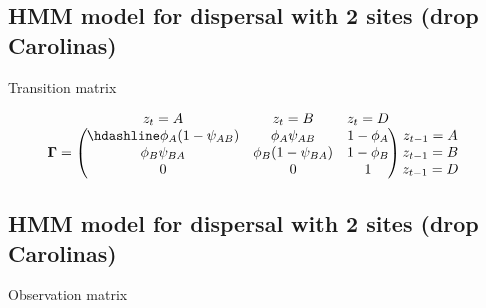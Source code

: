 \documentclass[
  12pt,
]{krantz}
\begin{document}
\hypertarget{hmm-model-for-dispersal-with-2-sites-drop-carolinas}{%
\subsection{HMM model for dispersal with 2 sites (drop Carolinas)}\label{hmm-model-for-dispersal-with-2-sites-drop-carolinas}}

Transition matrix

\[
\begin{matrix}
& \\
\mathbf{\Gamma} =
    \left ( \vphantom{ \begin{matrix} 12 \\ 12 \\ 12 \end{matrix} } \right .
\end{matrix}
\hspace{-1.2em}
\begin{matrix}
    z_{t}=A & z_{t}=B & z_{t}=D \\ \hdashline
\phi_A (1-\psi_{AB}) & \phi_A \psi_{AB} & 1 - \phi_A\\
\phi_B \psi_{BA} & \phi_B (1-\psi_{BA}) & 1 - \phi_B\\
0 & 0 & 1
\end{matrix}
\hspace{-0.2em}
\begin{matrix}
& \\
\left . \vphantom{ \begin{matrix} 12 \\ 12 \\ 12 \end{matrix} } \right )
    \begin{matrix}
    z_{t-1}=A \\ z_{t-1}=B \\ z_{t-1}=D
    \end{matrix}
\end{matrix}
\]

\hypertarget{hmm-model-for-dispersal-with-2-sites-drop-carolinas-1}{%
\subsection{HMM model for dispersal with 2 sites (drop Carolinas)}\label{hmm-model-for-dispersal-with-2-sites-drop-carolinas-1}}

Observation matrix
\end{document}
